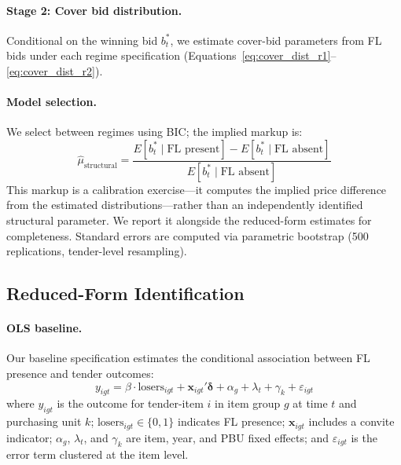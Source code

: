 \paragraph{Stage 2: Cover bid distribution.}
Conditional on the winning bid $b^*_t$, we estimate cover-bid parameters from FL bids under each regime specification (Equations~\ref{eq:cover_dist_r1}--\ref{eq:cover_dist_r2}).

\paragraph{Model selection.}
We select between regimes using BIC; the implied markup is:
\begin{equation}
  \hat{\mu}_{\text{structural}} =
  \frac{E[b^*_t \mid \text{FL present}] -
        E[b^*_t \mid \text{FL absent}]}{E[b^*_t \mid \text{FL absent}]}
  \label{eq:structural_markup}
\end{equation}
This markup is a calibration exercise---it computes the implied price
difference from the estimated distributions---rather than an
independently identified structural parameter. We report it alongside
the reduced-form estimates for completeness. Standard errors are
computed via parametric bootstrap (500 replications, tender-level
resampling).


\subsection{Reduced-Form Identification}
\label{sec:reduced_form}

\paragraph{OLS baseline.}
Our baseline specification estimates the conditional association between
FL presence and tender outcomes:
\begin{equation}
  y_{igt} = \beta \cdot \text{losers}_{igt} + \mathbf{x}_{igt}'
  \boldsymbol{\delta} + \alpha_g + \lambda_t + \gamma_k + \varepsilon_{igt}
  \label{eq:ols_main}
\end{equation}
where $y_{igt}$ is the outcome for tender-item $i$ in item group $g$ at
time $t$ and purchasing unit $k$; $\text{losers}_{igt} \in \{0,1\}$
indicates FL presence; $\mathbf{x}_{igt}$ includes a convite indicator;
$\alpha_g$, $\lambda_t$, and $\gamma_k$ are item, year, and PBU fixed
effects; and $\varepsilon_{igt}$ is the error term clustered at the item
level.

